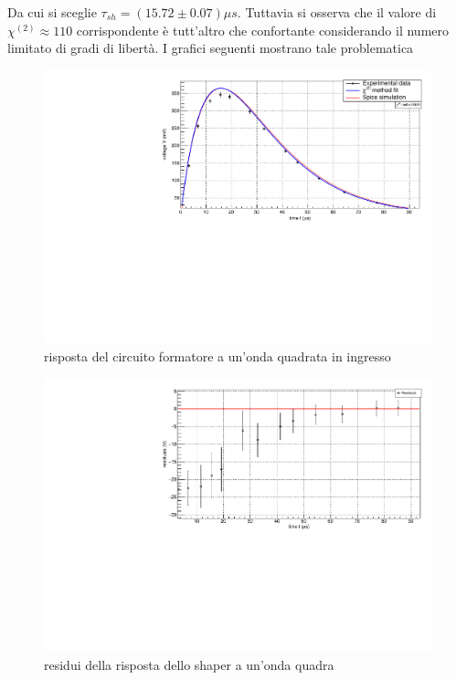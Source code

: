 \documentclass{article}
\begin{document}
Da cui si sceglie $\tau_{sh} = (15.72\pm 0.07) \mu s$.  Tuttavia si osserva che
il valore di $\chi^{(2)} \approx 110 $ corrispondente è tutt'altro che confortante 
considerando il numero limitato di gradi di libertà. I grafici seguenti
mostrano tale problematica


\begin{center}
    \begin{figure}[H]
    \centering
    \includegraphics[scale=0.375, angle=0]{forma_no_pz.pdf}
    \caption{risposta del circuito formatore a un'onda quadrata in ingresso}
    \label{fig:forma_no_pz}
    \end{figure}
\end{center}

\begin{center}
    \begin{figure}[H]
    \centering
    \includegraphics[scale=0.375, angle=0]{residui_forma_onda_no_pz.pdf}
    \caption{residui della risposta dello shaper a un'onda quadra}
    \label{fig:forma_no_pz}
    \end{figure}
\end{center}
\end{document}
